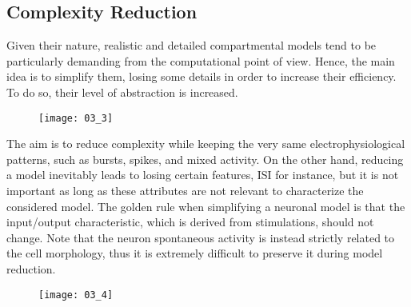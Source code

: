 \subsection{Complexity Reduction}
Given their nature, realistic and detailed compartmental models tend to be particularly
demanding from the computational point of view. Hence, the main idea is to simplify them,
losing some details in order to increase their efficiency. To do so, their level of
abstraction is increased.
\begin{figure}[H]
    \texttt{[image: 03\_3]}
    \centering
\end{figure}
The aim is to reduce complexity while keeping the very same electrophysiological patterns,
such as bursts, spikes, and mixed activity. On the other hand, reducing a model inevitably
leads to losing certain features, ISI for instance, but it is not important as long as
these attributes are not relevant to characterize the considered model. The golden rule
when simplifying a neuronal model is that the input/output characteristic, which is
derived from stimulations, should not change. Note that the neuron spontaneous activity is
instead strictly related to the cell morphology, thus it is extremely difficult to
preserve it during model reduction.
\begin{figure}[H]
    \texttt{[image: 03\_4]}
    \centering
\end{figure}
